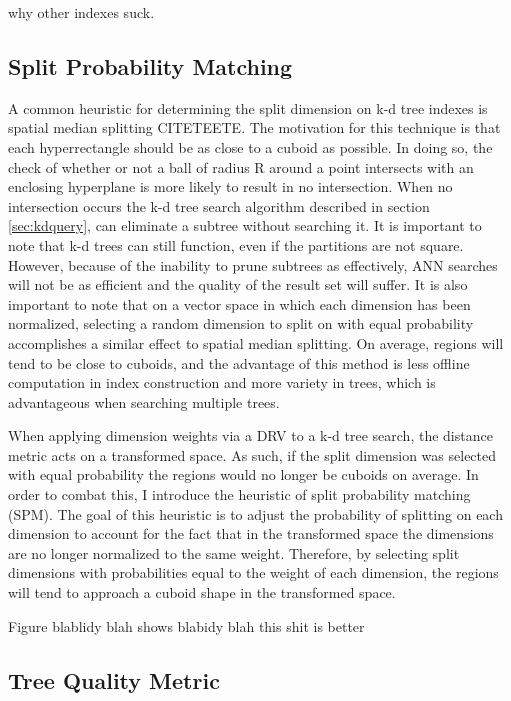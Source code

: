 why other indexes suck.

\subsection{Split Probability Matching}

A common heuristic for determining the split dimension on k-d tree indexes is spatial median splitting CITETEETE.  The motivation for this technique is that each hyperrectangle should be as close to a cuboid as possible.  In doing so, the check of whether or not a ball of radius R around a point intersects with an enclosing hyperplane is more likely to result in no intersection.  When no intersection occurs the k-d tree search algorithm described in section \ref{sec:kdquery}, can eliminate a subtree without searching it.  It is important to note that k-d trees can still function, even if the partitions are not square.  However, because of the inability to prune subtrees as effectively, ANN searches will not be as efficient and the quality of the result set will suffer.  It is also important to note that on a vector space in which each dimension has been normalized, selecting a random dimension to split on with equal probability accomplishes a similar effect to spatial median splitting.  On average, regions will tend to be close to cuboids, and the advantage of this method is less offline computation in index construction and more variety in trees, which is advantageous when searching multiple trees.

When applying dimension weights via a DRV to a k-d tree search, the distance metric acts on a transformed space.  As such, if the split dimension was selected with equal probability the regions would no longer be cuboids on average.  In order to combat this, I introduce the heuristic of split probability matching (SPM).  The goal of this heuristic is to adjust the probability of splitting on each dimension to account for the fact that in the transformed space the dimensions are no longer normalized to the same weight.  Therefore, by selecting split dimensions with probabilities equal to the weight of each dimension, the regions will tend to approach a cuboid shape in the transformed space.

Figure blablidy blah shows blabidy blah this shit is better

\subsection{Tree Quality Metric}

